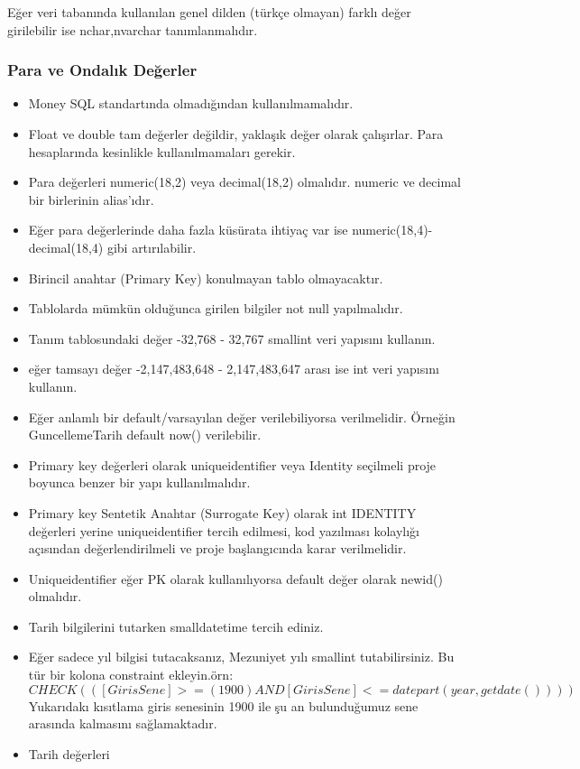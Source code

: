 \documentclass[10pt,a4paper,draft]{article}
\begin{document}
Eğer veri tabanında kullanılan genel dilden (türkçe olmayan) farklı değer girilebilir ise nchar,nvarchar tanımlanmalıdır.


\subsubsection{Para ve Ondalık Değerler}

\begin{itemize}
\item  Money SQL standartında olmadığından kullanılmamalıdır. 
\item  Float ve double tam değerler değildir, yaklaşık değer olarak çalışırlar. 
Para hesaplarında kesinlikle kullanılmamaları gerekir.
\item Para değerleri numeric(18,2) veya decimal(18,2) olmalıdır. numeric ve decimal bir birlerinin alias'ıdır. 
\item Eğer para değerlerinde daha fazla küsürata ihtiyaç var ise   numeric(18,4)-decimal(18,4) gibi artırılabilir. 

\end{itemize} 
 			

\begin{itemize}
\item   Birincil anahtar (Primary Key) konulmayan tablo olmayacaktır.		 
\item   Tablolarda mümkün olduğunca girilen bilgiler not null yapılmalıdır.
\item   Tanım tablosundaki değer  -32,768 - 32,767   smallint veri yapısını kullanın.
\item   eğer tamsayı değer  -2,147,483,648 - 2,147,483,647 arası ise int veri yapısını kullanın.
\item   Eğer anlamlı bir default/varsayılan değer verilebiliyorsa verilmelidir. Örneğin GuncellemeTarih default now() verilebilir.
\item Primary key değerleri olarak uniqueidentifier veya Identity seçilmeli proje boyunca benzer bir yapı kullanılmalıdır.
\item Primary key Sentetik Anahtar (Surrogate Key) olarak int IDENTITY değerleri yerine uniqueidentifier tercih edilmesi,
kod yazılması kolaylığı açısından değerlendirilmeli ve proje başlangıcında karar verilmelidir.
\item   Uniqueidentifier eğer PK olarak kullanılıyorsa default değer olarak newid() olmalıdır.	 

\item   			Tarih bilgilerini tutarken smalldatetime tercih ediniz. 			
\item   Eğer sadece  yıl bilgisi tutacaksanız, Mezuniyet yılı smallint tutabilirsiniz. 
Bu tür bir kolona constraint ekleyin.örn: 
  $  CHECK  (([GirisSene]>=(1900) AND   [GirisSene]<=datepart(year,getdate()))) $
Yukarıdakı kısıtlama 
  giris senesinin 1900 ile şu an bulunduğumuz sene arasında kalmasını 
  sağlamaktadır.
\item Tarih değerleri 
\end{itemize}  			
  		 
\end{document}
